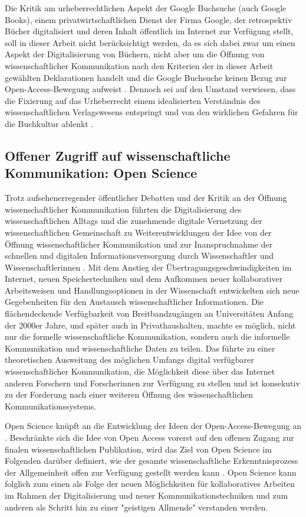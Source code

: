 Die Kritik am urheberrechtlichen Aspekt der Google Buchsuche (auch Google Books), einem privatwirtschaftlichen Dienst der Firma Google, der retrospektiv Bücher digitalisiert und deren Inhalt öffentlich im Internet zur Verfügung stellt, soll in dieser Arbeit nicht berücksichtigt werden, da es sich dabei zwar um einen Aspekt der Digitalisierung von Büchern, nicht aber um die Öffnung von wissenschaftlicher Kommunikation nach den Kriterien der in dieser Arbeit gewählten Deklarationen handelt und die Google Buchsuche keinen Bezug zur Open-Access-Bewegung aufweist \cite{hagner_2015_sache_buches}. Dennoch sei auf den Umstand verwiesen, dass die Fixierung auf das Urheberrecht einem idealisierten Verständnis des wissenschaftlichen Verlagswesens entspringt und von den wirklichen Gefahren für die Buchkultur ablenkt \cite{Hirschi_2015_buch_oa}.

\subsection{Offener Zugriff auf wissenschaftliche Kommunikation: Open Science}

Trotz aufsehenerregender öffentlicher Debatten und der Kritik an der Öffnung wissenschaftlicher Kommunikation führten die Digitalisierung des wissenschaftlichen Alltags und die zunehmende digitale Vernetzung der wissenschaftlichen Gemeinschaft zu Weiterentwicklungen der Idee von der Öffnung wissenschaftlicher Kommunikation und zur Inanspruchnahme der schnellen und digitalen Informationsversorgung durch Wissenschaftler und Wissenschaftlerinnen \cite{winkler_2011_anforderungen}. Mit dem Anstieg der Übertragungsgeschwindigkeiten im Internet, neuen Speichertechniken und dem Aufkommen neuer kollaborativer Arbeitsweisen und Handlungsoptionen in der Wissenschaft entwickelten sich neue Gegebenheiten für den Austausch wissenschaftlicher Informationen. Die flächendeckende Verfügbarkeit von Breitbandzugängen an Universitäten Anfang der 2000er Jahre, und später auch in Privathaushalten, machte es möglich, nicht nur die formelle wissenschaftliche Kommunikation, sondern auch die informelle Kommunikation und wissenschaftliche Daten zu teilen. Das führte zu einer theoretischen Ausweitung des möglichen Umfangs digital verfügbarer wissenschaftlicher Kommunikation, die Möglichkeit diese über das Internet anderen Forschern und Forscherinnen zur Verfügung zu stellen und ist konsekutiv zu der Forderung nach einer weiteren Öffnung des wissenschaftlichen Kommunikationssystems.

Open Science knüpft an die Entwicklung der Ideen der Open-Access-Bewegung an \cite{garcia_2010_open}. Beschränkte sich die Idee von Open Access vorerst auf den offenen Zugang zur finalen wissenschaftlichen Publikation, wird das Ziel von Open Science im Folgenden darüber definiert, wie der gesamte wissenschaftliche Erkenntnisprozess der Allgemeinheit offen zur Verfügung gestellt werden kann \cite{grand_2012_open}. Open Science kann folglich zum einen als Folge der neuen Möglichkeiten für kollaboratives Arbeiten im Rahmen der Digitalisierung und neuer Kommunikationstechniken und zum anderen als Schritt hin zu einer "geistigen Allmende" \cite{naeder_2010_open} verstanden werden.

